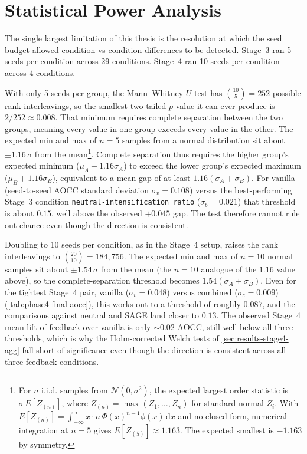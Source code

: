 \section{Statistical Power Analysis}
\label{sec:discussion-power}

The single largest limitation of this thesis is the resolution at which the seed budget allowed condition-vs-condition differences to be detected. Stage~3 ran 5 seeds per condition across 29 conditions. Stage~4 ran 10 seeds per condition across 4 conditions.

With only 5 seeds per group, the Mann--Whitney $U$ test has $\binom{10}{5} = 252$ possible rank interleavings, so the smallest two-tailed $p$-value it can ever produce is $2/252 \approx 0.008$. That minimum requires complete separation between the two groups, meaning every value in one group exceeds every value in the other. The expected min and max of $n = 5$ samples from a normal distribution sit about $\pm 1.16\,\sigma$ from the mean\footnote{For $n$ i.i.d. samples from $\mathcal{N}(0, \sigma^2)$, the expected largest order statistic is $\sigma\, E[Z_{(n)}]$, where $Z_{(n)} = \max(Z_1, \dots, Z_n)$ for standard normal $Z_i$. With $E[Z_{(n)}] = \int_{-\infty}^{\infty} x \cdot n\,\Phi(x)^{n-1} \phi(x)\,\mathrm{d}x$ and no closed form, numerical integration at $n = 5$ gives $E[Z_{(5)}] \approx 1.163$. The expected smallest is $-1.163$ by symmetry.}. Complete separation thus requires the higher group's expected minimum ($\mu_A - 1.16\sigma_A$) to exceed the lower group's expected maximum ($\mu_B + 1.16\sigma_B$), equivalent to a mean gap of at least $1.16(\sigma_A + \sigma_B)$. For vanilla (seed-to-seed AOCC standard deviation $\sigma_v = 0.108$) versus the best-performing Stage~3 condition \texttt{neutral-intensification\_ratio} ($\sigma_b = 0.021$) that threshold is about $0.15$, well above the observed $+0.045$ gap. The test therefore cannot rule out chance even though the direction is consistent.

Doubling to 10 seeds per condition, as in the Stage~4 setup, raises the rank interleavings to $\binom{20}{10} = 184{,}756$. The expected min and max of $n = 10$ normal samples sit about $\pm 1.54\,\sigma$ from the mean (the $n = 10$ analogue of the $1.16$ value above), so the complete-separation threshold becomes $1.54(\sigma_A + \sigma_B)$. Even for the tightest Stage~4 pair, vanilla ($\sigma_v = 0.048$) versus combined ($\sigma_c = 0.009$) (\cref{tab:phase4-final-aocc}), this works out to a threshold of roughly $0.087$, and the comparisons against neutral and SAGE land closer to $0.13$. The observed Stage~4 mean lift of feedback over vanilla is only $\sim 0.02$ AOCC, still well below all three thresholds, which is why the Holm-corrected Welch tests of \cref{sec:results-stage4-agg} fall short of significance even though the direction is consistent across all three feedback conditions.

